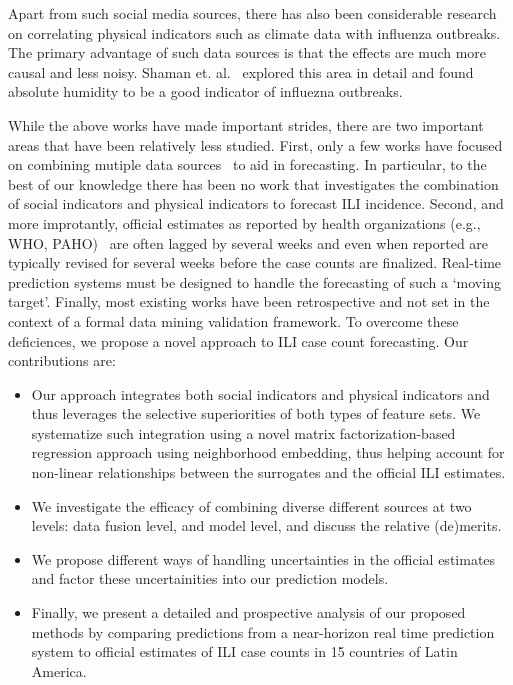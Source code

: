 Apart from such social media sources,
there has also been considerable research on 
correlating physical indicators such as climate data with influenza outbreaks. 
The primary advantage of such data sources is that the
effects are much more causal and less noisy. 
Shaman et. al.~\cite{ref9, Shaman_orig_humidity_link, Shaman_humidity_USA} 
explored this area in detail and found absolute humidity 
to be a good indicator of influezna outbreaks.

While the above works have made important strides, there are two important areas that
have been relatively less studied. First, 
only a few works have focused on combining mutiple data sources~\cite{ref10, ref3}
to aid in forecasting. In particular, to the best of our knowledge there has been no work
that investigates the combination of social indicators and physical indicators to forecast
ILI incidence. Second, and more improtantly, official estimates as reported by health
organizations (e.g., WHO, PAHO)~\cite{PAHO:2013} are often lagged by several weeks and
even when reported are typically revised for several weeks before the case counts are
finalized. Real-time prediction systems must be designed to handle the forecasting of
such a `moving target'. Finally, most existing works have been retrospective and not set in
the context of a formal data mining validation framework. To overcome these deficiences, we
propose a novel approach to ILI case count forecasting. Our contributions are:
\begin{itemize}
  \item Our approach integrates both social indicators and physical indicators and thus
leverages the selective superiorities of both types of feature sets. We systematize such
integration using a novel matrix factorization-based regression approach
using neighborhood embedding, thus helping account for 
non-linear relationships between the surrogates and the official ILI estimates.
  \item We investigate the efficacy of combining diverse different sources at two
levels: data fusion level, and model level, and discuss the relative (de)merits.
  \item We propose different ways of handling uncertainties in the official 
    estimates and factor these uncertainities into our prediction models.
  \item Finally, we present a detailed and prospective analysis of our proposed methods
    by comparing predictions from a near-horizon real time prediction system to 
    official estimates of ILI case counts in 15 countries of Latin America.
\end{itemize}

